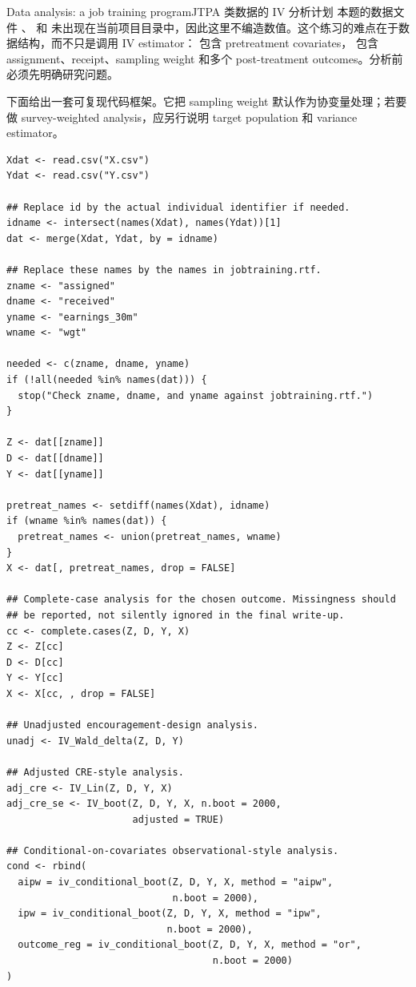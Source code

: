 \begin{exercisesolution}{Data analysis: a job training program}{JTPA 类数据的 IV 分析计划}
本题的数据文件 、 和  未出现在当前项目目录中，因此这里不编造数值。这个练习的难点在于数据结构，而不只是调用 IV estimator： 包含 pretreatment covariates， 包含 assignment、receipt、sampling weight 和多个 post-treatment outcomes。分析前必须先明确研究问题。

下面给出一套可复现代码框架。它把 sampling weight  默认作为协变量处理；若要做 survey-weighted analysis，应另行说明 target population 和 variance estimator。

\begin{lstlisting}
Xdat <- read.csv("X.csv")
Ydat <- read.csv("Y.csv")

## Replace id by the actual individual identifier if needed.
idname <- intersect(names(Xdat), names(Ydat))[1]
dat <- merge(Xdat, Ydat, by = idname)

## Replace these names by the names in jobtraining.rtf.
zname <- "assigned"
dname <- "received"
yname <- "earnings_30m"
wname <- "wgt"

needed <- c(zname, dname, yname)
if (!all(needed %in% names(dat))) {
  stop("Check zname, dname, and yname against jobtraining.rtf.")
}

Z <- dat[[zname]]
D <- dat[[dname]]
Y <- dat[[yname]]

pretreat_names <- setdiff(names(Xdat), idname)
if (wname %in% names(dat)) {
  pretreat_names <- union(pretreat_names, wname)
}
X <- dat[, pretreat_names, drop = FALSE]

## Complete-case analysis for the chosen outcome. Missingness should
## be reported, not silently ignored in the final write-up.
cc <- complete.cases(Z, D, Y, X)
Z <- Z[cc]
D <- D[cc]
Y <- Y[cc]
X <- X[cc, , drop = FALSE]

## Unadjusted encouragement-design analysis.
unadj <- IV_Wald_delta(Z, D, Y)

## Adjusted CRE-style analysis.
adj_cre <- IV_Lin(Z, D, Y, X)
adj_cre_se <- IV_boot(Z, D, Y, X, n.boot = 2000,
                      adjusted = TRUE)

## Conditional-on-covariates observational-style analysis.
cond <- rbind(
  aipw = iv_conditional_boot(Z, D, Y, X, method = "aipw",
                             n.boot = 2000),
  ipw = iv_conditional_boot(Z, D, Y, X, method = "ipw",
                            n.boot = 2000),
  outcome_reg = iv_conditional_boot(Z, D, Y, X, method = "or",
                                    n.boot = 2000)
)


\end{lstlisting}
\end{exercisesolution}
